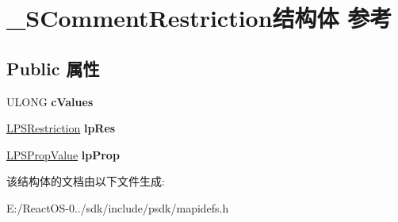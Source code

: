 \hypertarget{struct___s_comment_restriction}{}\section{\+\_\+\+S\+Comment\+Restriction结构体 参考}
\label{struct___s_comment_restriction}
\subsection*{Public 属性}
\begin{DoxyCompactItemize}
\item 
\mbox{\label{struct___s_comment_restriction_ae477136c95b714b0cde70be8097e1c4a}} 
U\+L\+O\+NG {\bfseries c\+Values}
\item 
\mbox{\label{struct___s_comment_restriction_aa2d5e0544f57b8eb25628f1449da5f6e}} 
\hyperlink{struct___s_restriction}{L\+P\+S\+Restriction} {\bfseries lp\+Res}
\item 
\mbox{\label{struct___s_comment_restriction_a42e29550baed0784098ee5e79e31b985}} 
\hyperlink{struct___s_prop_value}{L\+P\+S\+Prop\+Value} {\bfseries lp\+Prop}
\end{DoxyCompactItemize}


该结构体的文档由以下文件生成\+:\begin{DoxyCompactItemize}
\item 
E\+:/\+React\+O\+S-\/0../sdk/include/psdk/mapidefs.\+h\end{DoxyCompactItemize}
